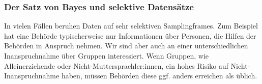 \documentclass[18pt,handout, aspectratio=169]{beamer}
\begin{document}
\begin{frame}
\frametitle{Der Satz von Bayes und selektive Datensätze}

In vielen Fällen beruhen Daten auf sehr selektiven Samplingframes. Zum Beispiel hat eine Behörde typischerweise nur Informationen über Personen, die Hilfen der Behörden in Anspruch nehmen. Wir sind aber auch an einer unterschiedlichen Inanspruchnahme über Gruppen interessiert. Wenn Gruppen, wie Alleinerziehende oder Nicht-Muttersprachler:innen, ein hohes Risiko auf Nicht-Inanspruchnahme haben, müssen Behörden diese ggf. anders erreichen als üblich.\\[1em]

 \end{frame}
\end{document}
